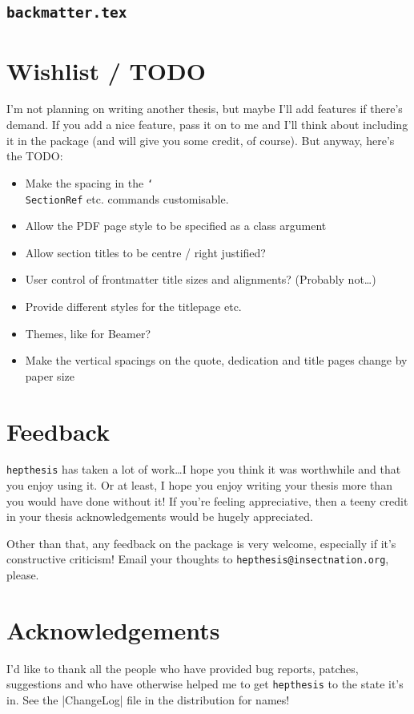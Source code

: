 \documentclass[12pt]{article}
\newcommand{\hepthesis}{\texttt{hepthesis}\xspace}
\newcommand{\texcmd}[1]{\texorpdfstring{\texttt{\char`\\#1}}{#1}}
\begin{document}
\subsection{\texttt{backmatter.tex}}
{\smaller {}}


\section{Wishlist / TODO}
I'm not planning on writing another thesis, but maybe I'll add features if
there's demand. If you add a nice feature, pass it on to me and I'll think about
including it in the package (and will give you some credit, of course). But anyway,
here's the TODO:
%
\begin{itemize}
\item Make the spacing in the \texcmd{SectionRef} etc. commands customisable.
\item Allow the PDF page style to be specified as a class argument
\item Allow section titles to be centre / right justified?
\item User control of frontmatter title sizes and alignments? (Probably not\dots)
\item Provide different styles for the titlepage etc.
\item Themes, like for Beamer?
\item Make the vertical spacings on the quote, dedication and title pages change by paper size
\end{itemize}


\section{Feedback}
\hepthesis has taken a lot of work\dots I hope you think it was worthwhile and
that you enjoy using it. Or at least, I hope you enjoy writing your thesis more
than you would have done without it! If you're feeling appreciative, then a teeny
credit in your thesis acknowledgements would be hugely appreciated.

Other than that, any feedback on the package is very welcome, especially if it's
constructive criticism! Email your thoughts to
\texttt{hepthesis@insectnation.org}, please.


\section{Acknowledgements}
I'd like to thank all the people who have provided bug reports, patches, suggestions
and who have otherwise helped me to get \hepthesis to the state it's in. See the
|ChangeLog| file in the distribution for names!
\end{document}
